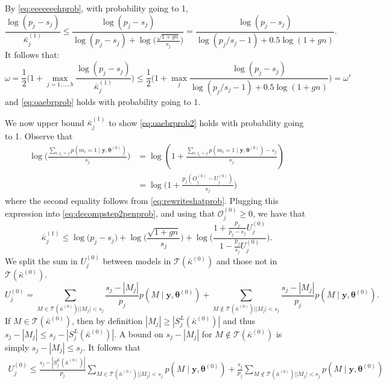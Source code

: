 \documentclass[
  12pt]{article}
\newcommand{\T}{\mathcal{T}}
\newcommand{\OO}{\mathcal{O}}
\newcommand{\by}{\mathbf{y}}
\newcommand{\btheta}{\boldsymbol{\theta}}
\begin{document}
By \eqref{eq:eeeeeeehprob}, with probability going to 1,
$$ \frac{\log(p_j-s_j)}{\bar{\kappa}^{(1)}_j}
    \leq \frac{\log(p_j-s_j)}{\log(p_j-s_j)+\log\Big(\frac{\sqrt{1+gn}}{s_j}\Big)} =  \frac{\log(p_j-s_j)}{\log(p_j/s_j-1)+0.5\log(1+gn)} .$$
It follows that:
\begin{equation*}
    \omega=\frac12\Big(1+\max_{j=1, \ldots,b}\frac{\log(p_j-s_j)}{\bar{\kappa}^{(1)}_j}\Big) \leq \frac12\Big(1+\max_j \frac{\log(p_j-s_j)}{\log(p_j/s_j-1)+0.5\log(1+gn)}\Big)=\omega'
\end{equation*}
and \eqref{eq:oaebrprob} holds with probability going to 1.

We now upper bound $\bar{\kappa}^{(1)}_j$ to show \eqref{eq:oaebrprob2} holds with probability going to 1. Observe that 
\begin{align*}
    \log\Big(\frac{\sum_{i:z_i=j}p(m_i=1 \mid \by, \btheta^{(0)}) }{s_j}\Big)
    &= \log \left( 1 + \frac{\sum_{i:z_i=j}p(m_i=1 \mid \by, \btheta^{(0)})  - s_j}{s_j}\right) \\
    &=\log\Big(1+\frac{p_j(O^{(0)}_j-U^{(0)}_j)}{s_j}\Big)
\end{align*}
where the second equality follows from \eqref{eq:rewriteshatprob}.
Plugging this expression into \eqref{eq:decompstep2penprob}, and using that $\OO_j^{(0)} \geq 0$, we have that  %
\begin{equation}\label{eq:ggggggggprob}
    \bar{\kappa}^{(1)}_j \leq \log\big(p_j-s_j\big)+\log\Big(\frac{\sqrt{1+gn}}{s_j}\Big)+\log\bigg(\frac{1+\frac{p_j}{p_j-s_j}U^{(0)}_j}{1-\frac{p_j}{s_j}U^{(0)}_j}\bigg).
\end{equation}
We split the sum in $U^{(0)}_j$ between models in $\T(\bar{\kappa}^{(0)})$ and those not in $\T(\bar{\kappa}^{(0)})$. 
$$U_j^{(0)} = \sum_{M \in \T(\bar{\kappa}^{(0)}) | |M_j| < s_j}\frac{s_j-|M_j|}{p_j}p(M\mid \by, \btheta^{(0)})+\sum_{M \not\in \T(\bar{\kappa}^{(0)}) | |M_j| < s_j}\frac{s_j-|M_j|}{p_j}p(M\mid \by, \btheta^{(0)}).
$$
If $M\in \T(\bar{\kappa}^{(0)})$, then by definition $|M_j|\geq |S^{L}_j(\bar{\kappa}^{(0)})|$ and thus $s_j-|M_j|\leq s_j-|S^{L}_j(\bar{\kappa}^{(0)})|$. A bound on $s_j-|M_j|$ for $M\not\in \T(\bar{\kappa}^{(0)})$ is simply $s_j-|M_j|\leq s_j$. It follows that
\begin{eqnarray*}
    U^{(0)}_j \leq \frac{s_j-|S^{L}_j(\bar{\kappa}^{(0)})|}{p_j}\sum_{M \in \T(\bar{\kappa}^{(0)}) | |M_j| < s_j}p(M\mid \by, \btheta^{(0)})+  \frac{s_j}{p_j}\sum_{M  \not\in \T(\bar{\kappa}^{(0)})| |M_j| < s_j}p(M\mid \by, \btheta^{(0)})
\end{eqnarray*}
\end{document}
